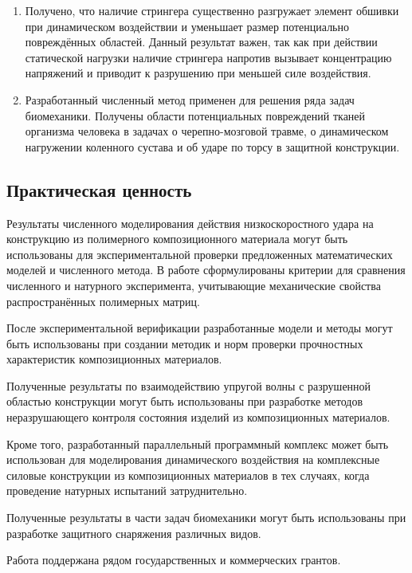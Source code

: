 \begin{enumerate}
\item Получено, что наличие стрингера существенно разгружает элемент обшивки при динамическом воздействии и уменьшает размер потенциально повреждённых областей. Данный результат важен, так как при действии статической нагрузки наличие стрингера напротив вызывает концентрацию напряжений и приводит к разрушению при меньшей силе воздействия.

\item Разработанный численный метод применен для решения ряда задач биомеханики. Получены области потенциальных повреждений тканей организма человека в задачах о черепно-мозговой травме, о динамическом нагружении коленного сустава и об ударе по торсу в защитной конструкции.

\end{enumerate}

\subsection*{Практическая ценность}

Результаты численного моделирования действия низкоскоростного удара на конструкцию из полимерного композиционного материала могут быть использованы для экспериментальной проверки предложенных математических моделей и численного метода. В работе сформулированы критерии для сравнения численного и натурного эксперимента, учитывающие механические свойства распространённых полимерных матриц.

После экспериментальной верификации разработанные модели и методы могут быть использованы при создании методик и норм проверки прочностных характеристик композиционных материалов.

Полученные результаты по взаимодействию упругой волны с разрушенной областью конструкции могут быть использованы при разработке методов неразрушающего контроля состояния изделий из композиционных материалов.

Кроме того, разработанный параллельный программный комплекс может быть использован для моделирования динамического воздействия на комплексные силовые конструкции из композиционных материалов в тех случаях, когда проведение натурных испытаний затруднительно.

Полученные результаты в части задач биомеханики могут быть использованы при разработке защитного снаряжения различных видов.

Работа поддержана рядом государственных и коммерческих грантов.

